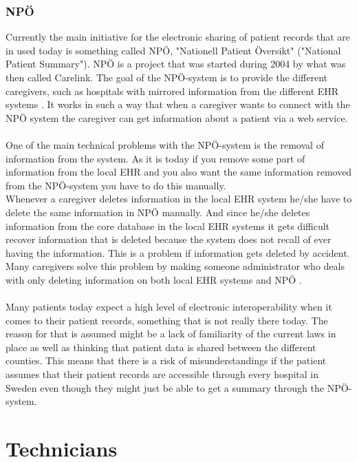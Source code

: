 \documentclass[14pt]{article}
\begin{document}
\subsubsection{NPÖ}
Currently the main initiative for the electronic sharing of patient records that are in used today is something called NPÖ, "Nationell Patient Översikt" ("National Patient Summary"). NPÖ is a project that was started during 2004 by what was then called Carelink\cite{ViktorJernelov}. The goal of the NPÖ-system is to provide the different caregivers, such as hospitals with mirrored information from the different \gls{EHR} systems \cite{ViktorJernelov}. It works in such a way that when a caregiver wants to connect with the NPÖ system the caregiver can get information about a patient via a web service. 
\\\\
One of the main technical problems with the NPÖ-system is the removal of information from the system. As it is today if you remove some part of information from the local \gls{EHR} and you also want the same information removed from the NPÖ-system you have to do this manually.
\\ %
Whenever a caregiver deletes information in the local EHR system he/she have to delete the same information in NPÖ manually. And since he/she deletes information from the core database in the local EHR systems it gets difficult recover information that is deleted because the system does not recall of ever having the information. This is a problem if information gets deleted by accident. Many caregivers solve this problem by making someone administrator who deals with only deleting information on both local EHR systems and NPÖ  \cite{ViktorJernelov}.
\\\\
Many patients today expect a high level of electronic \gls{interoperability} when it comes to their patient records\cite{EPJ2}, something that is not really there today. The reason for that is assumed might be a lack of familiarity of the current laws in place as well as thinking that patient data is shared between the different counties. This means that there is a risk of misunderstandings if the patient assumes that their patient records are accessible through every hospital in Sweden even though they might just be able to get a summary through the NPÖ-system.

\section{Technicians}
\end{document}
